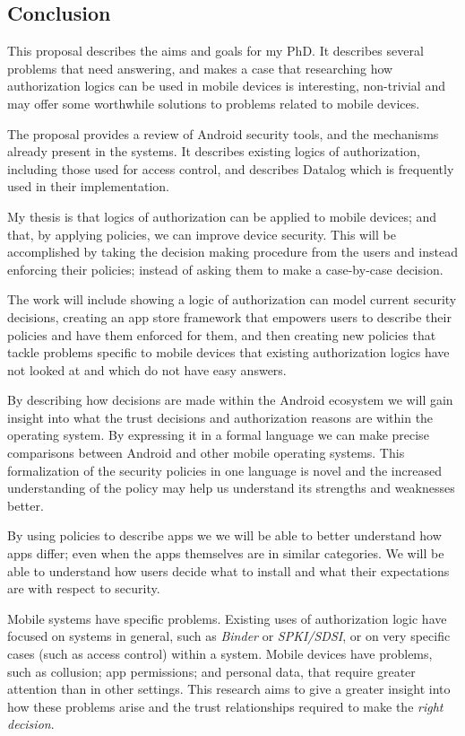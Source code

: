 \documentclass[a4paper]{article}
\begin{document}
\subsection{Conclusion}

This proposal describes the aims and goals for my PhD.  It describes several
problems that need answering, and makes a case that researching how
authorization logics can be used in mobile devices is interesting, non-trivial
and may offer some worthwhile solutions to problems related to mobile devices.

The proposal provides a review of Android security tools, and the mechanisms
already present in the systems.  It describes existing logics of authorization,
including those used for access control, and describes Datalog which is
frequently used in their implementation. 

My thesis is that logics of authorization can be applied to mobile devices; and
that, by applying policies, we can improve device security.  This will be
accomplished by taking the decision making procedure from the users and instead
enforcing their policies; instead of asking them to make a case-by-case
decision.

The work will include showing a logic of authorization can model current
security decisions, creating an app store framework that empowers users to
describe their policies and have them enforced for them, and then creating new
policies that tackle problems specific to mobile devices that existing
authorization logics have not looked at and which do not have easy answers.


By describing how decisions are made within the Android ecosystem we will gain
insight into what the trust decisions and authorization reasons are within the
operating system.  By expressing it in a formal language we can make precise
comparisons between Android and other mobile operating systems.  This
formalization of the security policies in one language is novel and the
increased understanding of the policy may help us understand its strengths and
weaknesses better.

By using policies to describe apps we we will be able to better understand how
apps differ; even when the apps themselves are in similar categories.  We will
be able to understand how users decide what to install and what their
expectations are with respect to security.

Mobile systems have specific problems.  Existing uses of authorization logic
have focused on systems in general, such as \emph{Binder} or \emph{SPKI/SDSI},
or on very specific cases (such as access control) within a system.  Mobile
devices have problems, such as collusion; app permissions; and personal data,
that require greater attention than in other settings.  This research aims to give
a greater insight into how these problems arise and the trust relationships
required to make the \emph{right decision}.
\end{document}
